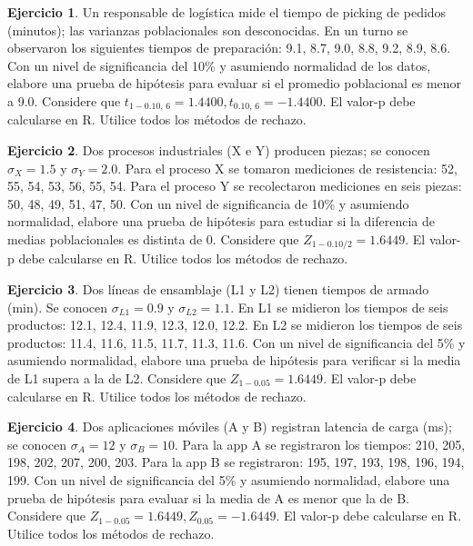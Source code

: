 \documentclass[
  11pt,
]{book}
\theoremstyle{definition}
\theoremstyle{definition}
\theoremstyle{definition}
\newtheorem{exercise}{Ejercicio}[chapter]
\theoremstyle{definition}
\theoremstyle{remark}
\begin{document}
\begin{exercise}
Un responsable de logística mide el tiempo de picking de pedidos (minutos); las varianzas poblacionales son desconocidas. En un turno se observaron los siguientes tiempos de preparación: 9.1, 8.7, 9.0, 8.8, 9.2, 8.9, 8.6. Con un nivel de significancia del 10\% y asumiendo normalidad de los datos, elabore una prueba de hipótesis para evaluar si el promedio poblacional es menor a 9.0. Considere que \(t_{1-0.10,\,6}=1.4400, t_{0.10,\,6}=-1.4400\). El valor-p debe calcularse en R. Utilice todos los métodos de rechazo.
\end{exercise}

\begin{exercise}
Dos procesos industriales (X e Y) producen piezas; se conocen \(\sigma_X=1.5\) y \(\sigma_Y=2.0\). Para el proceso X se tomaron mediciones de resistencia: 52, 55, 54, 53, 56, 55, 54. Para el proceso Y se recolectaron mediciones en seis piezas: 50, 48, 49, 51, 47, 50. Con un nivel de significancia de 10\% y asumiendo normalidad, elabore una prueba de hipótesis para estudiar si la diferencia de medias poblacionales es distinta de 0. Considere que \(Z_{1-0.10/2}=1.6449\). El valor-p debe calcularse en R. Utilice todos los métodos de rechazo.
\end{exercise}

\begin{exercise}
Dos líneas de ensamblaje (L1 y L2) tienen tiempos de armado (min). Se conocen \(\sigma_{L1}=0.9\) y \(\sigma_{L2}=1.1\). En L1 se midieron los tiempos de seis productos: 12.1, 12.4, 11.9, 12.3, 12.0, 12.2. En L2 se midieron los tiempos de seis productos: 11.4, 11.6, 11.5, 11.7, 11.3, 11.6. Con un nivel de significancia del 5\% y asumiendo normalidad, elabore una prueba de hipótesis para verificar si la media de L1 supera a la de L2. Considere que \(Z_{1-0.05}=1.6449\). El valor-p debe calcularse en R. Utilice todos los métodos de rechazo.
\end{exercise}

\begin{exercise}
Dos aplicaciones móviles (A y B) registran latencia de carga (ms); se conocen \(\sigma_A=12\) y \(\sigma_B=10\). Para la app A se registraron los tiempos: 210, 205, 198, 202, 207, 200, 203. Para la app B se registraron: 195, 197, 193, 198, 196, 194, 199. Con un nivel de significancia del 5\% y asumiendo normalidad, elabore una prueba de hipótesis para evaluar si la media de A es menor que la de B. Considere que \(Z_{1-0.05}=1.6449, Z_{0.05}=-1.6449\). El valor-p debe calcularse en R. Utilice todos los métodos de rechazo.
\end{exercise}
\end{document}
